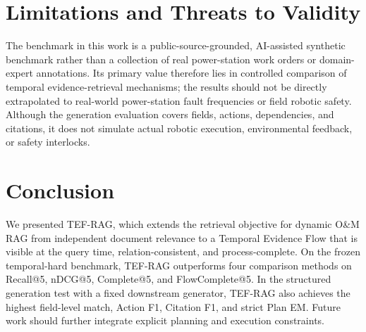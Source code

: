 \section{Limitations and Threats to Validity}
\label{sec:limitations}

The benchmark in this work is a public-source-grounded, AI-assisted synthetic benchmark rather than a collection of real power-station work orders or domain-expert annotations.
Its primary value therefore lies in controlled comparison of temporal evidence-retrieval mechanisms; the results should not be directly extrapolated to real-world power-station fault frequencies or field robotic safety.
Although the generation evaluation covers fields, actions, dependencies, and citations, it does not simulate actual robotic execution, environmental feedback, or safety interlocks.

\section{Conclusion}
\label{sec:conclusion}

We presented TEF-RAG, which extends the retrieval objective for dynamic O\&M RAG from independent document relevance to a Temporal Evidence Flow that is visible at the query time, relation-consistent, and process-complete.
On the frozen temporal-hard benchmark, TEF-RAG outperforms four comparison methods on Recall@5, nDCG@5, Complete@5, and FlowComplete@5.
In the structured generation test with a fixed downstream generator, TEF-RAG also achieves the highest field-level match, Action F1, Citation F1, and strict Plan EM.
Future work should further integrate explicit planning and execution constraints.
